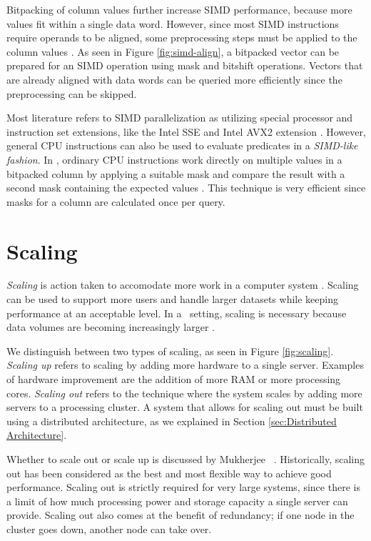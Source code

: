 Bitpacking of column values further increase SIMD performance, because more values fit within a single data word. However, since most SIMD instructions require operands to be aligned, some preprocessing steps must be applied to the column values \cite{Willhalm2009-hu}. As seen in Figure \ref{fig:simd-align}, a bitpacked vector can be prepared for an SIMD operation using mask and bitshift operations. Vectors that are already aligned with data words can be queried more efficiently since the preprocessing can be skipped.

Most literature refers to SIMD parallelization as utilizing special processor and instruction set extensions, like the Intel SSE and Intel AVX2 extension \cite{Willhalm2013-ri, Willhalm2009-hu}. However, general CPU instructions can also be used to evaluate predicates in a \textit{SIMD-like fashion}. In \blink, ordinary CPU instructions work directly on multiple values in a bitpacked column by applying a suitable mask and compare the result with a second mask containing the expected values \cite{Johnson2008-cp}. This technique is very efficient since masks for a column are calculated once per query.

\section{Scaling}
\label{sec:Scaling}
\textit{Scaling} is action taken to accomodate more work in a computer system \cite{Wikipedia_contributors2015-lw}. Scaling can be used to support more users and handle larger datasets while keeping performance at an acceptable level. In a \bd~setting, scaling is necessary because data volumes are becoming increasingly larger \cite{Qlik2012-ku}.


We distinguish between two types of scaling, as seen in Figure \ref{fig:scaling}. \textit{Scaling up} refers to scaling by adding more hardware to a single server. Examples of hardware improvement are the addition of more RAM or more processing cores. \textit{Scaling out} refers to the technique where the system scales by adding more servers to a processing cluster. A system that allows for scaling out must be built using a distributed architecture, as we explained in Section \ref{sec:Distributed Architecture}.

Whether to scale out or scale up is discussed by Mukherjee \ea~\cite{Mukherjee2015-ul}. Historically, scaling out has been considered as the best and most flexible way to achieve good performance. Scaling out is strictly required for very large systems, since there is a limit of how much processing power and storage capacity a single server can provide. Scaling out also comes at the benefit of redundancy; if one node in the cluster goes down, another node can take over.

